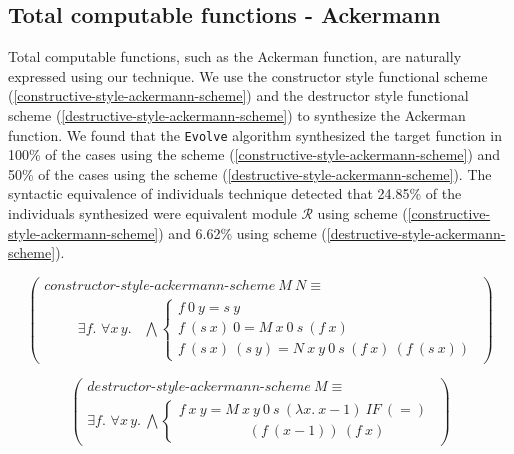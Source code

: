 \subsection{Total computable functions - Ackermann}
Total computable functions, such as the Ackerman function, are naturally expressed using our technique. We use the constructor style functional scheme (\ref{constructive-style-ackermann-scheme}) and the destructor style functional scheme (\ref{destructive-style-ackermann-scheme}) to synthesize the Ackerman function. We found that the {\tt Evolve} algorithm synthesized the target function in 100\% of the cases using the scheme (\ref{constructive-style-ackermann-scheme}) and 50\% of the cases using the scheme (\ref{destructive-style-ackermann-scheme}). The syntactic equivalence of individuals technique detected that 24.85\% of the individuals synthesized were equivalent module $\mathcal{R}$ using scheme (\ref{constructive-style-ackermann-scheme}) and 6.62\% using scheme (\ref{destructive-style-ackermann-scheme}).

\begin{equation}
  \left(\begin{array}{l}
    constructor\textrm{-}style\textrm{-}ackermann\textrm{-}scheme\ M\ N \equiv \\
    \quad \quad \begin{array}{c}
      \exists f.\,\, \forall x\, y. \phantom{,}
    \end{array}
    \bigwedge \left\{
    \begin{array}{l}
      f\ 0\ y = s\ y\\
      f\ (s\ x)\ 0 = M\ x\ 0\ s\ (f\ x)\\
      f\ (s\ x)\ (s\ y) = N\ x\ y\ 0\ s\ (f\ x)\ (f\ (s\ x))
    \end{array}
    \right.
  \end{array}\right)
  \label{constructive-style-ackermann-scheme}
\end{equation}

\begin{equation}
  \left(\begin{array}{l}
    destructor\textrm{-}style\textrm{-}ackermann\textrm{-}scheme\ M \equiv \\
    \exists f.\,\, \forall x\, y.\ \bigwedge \left\{
    \begin{array}{l}
      f\ x\ y  =  M\ x\ y\ 0\ s\ (\lambda x.\ x-1)\ IF\ (=)\\
      \quad\quad\quad\quad\quad(f\ (x-1))\ (f\ x)
    \end{array}\right.
  \end{array}\right)
  \label{destructive-style-ackermann-scheme}
\end{equation}

